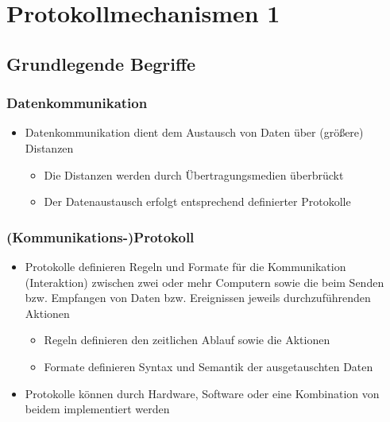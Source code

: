 \newpage
\section{Protokollmechanismen 1}
  \subsection{Grundlegende Begriffe}
    \subsubsection{Datenkommunikation}
      \begin{itemize}
        \item Datenkommunikation dient dem Austausch von Daten über (größere) Distanzen
          \begin{itemize}
            \item Die Distanzen werden durch Übertragungsmedien überbrückt
            \item Der Datenaustausch erfolgt entsprechend definierter Protokolle
          \end{itemize}
      \end{itemize}
      \subsubsection{(Kommunikations-)Protokoll}
      \begin{itemize}
        \item Protokolle definieren Regeln und Formate für die Kommunikation (Interaktion) zwischen
          zwei oder mehr Computern sowie die beim Senden bzw. Empfangen von Daten bzw. Ereignissen
          jeweils durchzuführenden Aktionen
          \begin{itemize}
            \item Regeln definieren den zeitlichen Ablauf sowie die Aktionen
            \item Formate definieren Syntax und Semantik der ausgetauschten Daten
          \end{itemize}
        \item Protokolle können durch Hardware, Software oder eine Kombination von beidem implementiert
          werden
      \end{itemize}
